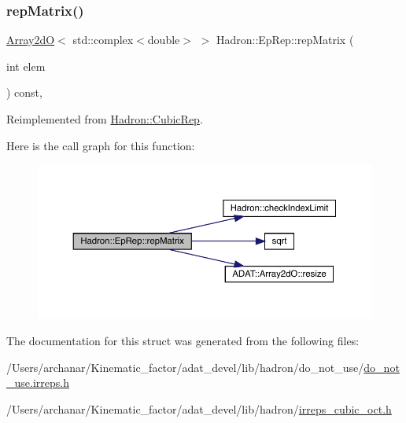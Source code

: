 \subsubsection{\texorpdfstring{repMatrix()}{repMatrix()}\hspace{0.1cm}{\footnotesize\ttfamily [2/2]}}
{\footnotesize\ttfamily \mbox{\hyperlink{classADAT_1_1Array2dO}{Array2dO}}$<$ std\+::complex$<$double$>$ $>$ Hadron\+::\+Ep\+Rep\+::rep\+Matrix (\begin{DoxyParamCaption}\item[{int}]{elem }\end{DoxyParamCaption}) const\hspace{0.3cm}{\ttfamily [inline]}, {\ttfamily [virtual]}}



Reimplemented from \mbox{\hyperlink{structHadron_1_1CubicRep_ac5d7e9e6f4ab1158b5fce3e4ad9e8005}{Hadron\+::\+Cubic\+Rep}}.

Here is the call graph for this function\+:
\nopagebreak
\begin{figure}[H]
\begin{center}
\leavevmode
\includegraphics[width=350pt]{d7/da2/structHadron_1_1EpRep_a51731663ac1ad2e9e41f7527b536e2b5_cgraph}
\end{center}
\end{figure}


The documentation for this struct was generated from the following files\+:\begin{DoxyCompactItemize}
\item 
/\+Users/archanar/\+Kinematic\+\_\+factor/adat\+\_\+devel/lib/hadron/do\+\_\+not\+\_\+use/\mbox{\hyperlink{do__not__use_8irreps_8h}{do\+\_\+not\+\_\+use.\+irreps.\+h}}\item 
/\+Users/archanar/\+Kinematic\+\_\+factor/adat\+\_\+devel/lib/hadron/\mbox{\hyperlink{lib_2hadron_2irreps__cubic__oct_8h}{irreps\+\_\+cubic\+\_\+oct.\+h}}\end{DoxyCompactItemize}
